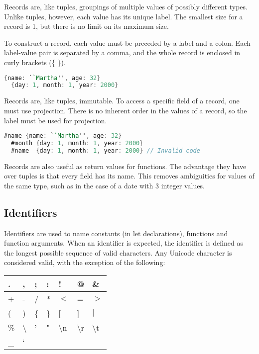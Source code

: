 \documentclass{article}
\begin{document}
Records are, like tuples, groupings of multiple values of possibly different types.
Unlike tuples, however, each value has its unique label.
The smallest size for a record is 1, but there is no limit on its maximum size.

To construct a record, each value must be preceded by a label and a colon.
Each label-value pair is separated by a comma, and the whole record is enclosed in curly brackets (\{ \}).

\begin{lstlisting}[language=V]
  {name: ``Martha'', age: 32}
  {day: 1, month: 1, year: 2000}
\end{lstlisting}

Records are, like tuples, immutable.
To access a specific field of a record, one must use projection.
There is no inherent order in the values of a record, so the label must be used for projection.

\begin{lstlisting}[language=V]
  #name {name: ``Martha'', age: 32}
  #month {day: 1, month: 1, year: 2000}
  #name  {day: 1, month: 1, year: 2000} // Invalid code
\end{lstlisting}

Records are also useful as return values for functions.
The advantage they have over tuples is that every field has its name.
This removes ambiguities for values of the same type, such as in the case of a date with 3 integer values.

\subsection{Identifiers}

Identifiers are used to name constants (in let declarations), functions and function arguments.
When an identifier is expected, the identifier is defined as the longest possible sequence of valid characters.
Any Unicode character is considered valid, with the exception of the following:

\medskip

\begin{tabular}{|l|l|l|l|l|l|l|}
  \hline
  . & , & ; & : & ! & @ & \&\\
  \hline
  + & - & / & * & $<$ & = & $>$ \\
  \hline
  ( & ) & \{ & \} & [ & ] & $|$ \\
  \hline
  \% & \textbackslash & ' & " & \textbackslash n & \textbackslash r & \textbackslash t\\
  \hline
  \_ & \lq\\
  \hline
\end{tabular}
\end{document}
